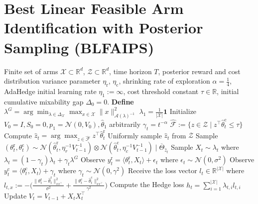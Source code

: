 \documentclass[accepted]{uai2025} %
\theoremstyle{plain}
\theoremstyle{definition}
\theoremstyle{remark}
\begin{document}
\section{Best Linear Feasible Arm Identification with Posterior Sampling (BLFAIPS)}
\begin{algorithm}
\begin{algorithmic}[1]
\Require Finite set of arms $\mathcal{X} \subset \mathbb{R}^d$, $\mathcal{Z} \subset \mathbb{R}^d$, time horizon $T$, posterior reward and cost distribution variance parameter $\eta_\mathrm{r}$, $\eta_\mathrm{c}$, shrinking rate of exploration $\alpha=\frac{1}{4}$, AdaHedge initial learning rate $\eta_1:=\infty$, cost threshold constant $\tau \in \mathbb{R}$, initial cumulative mixability gap $\Delta_0=0$.
\State \textbf{Define} $\lambda^G = \arg\min_{\lambda \in \Delta_{\mathcal{X}}} \max_{x \in \mathcal{X}} \lVert x\rVert^2_{\mathcal{A}(\lambda)^{-1}}$
\State $\lambda_1 = \frac{1}{|\mathcal{X}|} \mathbf{1}$
\State Initialize $V_0 = I, S_0 = 0, p_1 = \mathcal{N}(0,V_0), \hat{\theta}_1$ arbitrarily
    \State $\gamma_t = t^{-\alpha}$
    \State $\hat{\mathcal{F}} := \{ z\in \mathcal{Z} \mid z^\top \hat{\theta}^{\mathrm{c}}_t \le \tau \}$
        \State Compute $\hat{z}_t = \arg\max_{z \in \hat{\mathcal{F}}} z^\top \hat{\theta}^{\mathrm{r}}_t$
    \Else
        \State Uniformly sample $\hat{z}_t$ from $\mathcal{Z}$
    \EndIf
    \State Sample $(\theta^{\mathrm{r}}_t,  \theta^{\mathrm{c}}_t) \sim \mathcal{N}(\hat{\theta}^{\mathrm{r}}_t, \eta_r^{-1} V_{t-1}^{-1}) \otimes \mathcal{N}(\hat{\theta}^{\mathrm{c}}_t, \eta_c^{-1} V_{t-1}^{-1}) \mid \overline{\Theta}_{\hat{z}_t}$
    \State Sample $X_t \sim \lambda_t$ where $\lambda_t = (1-\gamma_t) \lambda_t + \gamma_t \lambda^G$
    \State Observe $y^{\mathrm{r}}_t = \langle \theta^{\mathrm{r}}_t, X_t \rangle + \epsilon_t$ where $\epsilon_t \sim \mathcal{N}(0,\sigma^2)$
    \State Observe $y^{\mathrm{c}}_t = \langle \theta^{\mathrm{c}}_t, X_t \rangle + \gamma_t$ where $\gamma_t \sim \mathcal{N}(0,\gamma^2)$
    \State Receive the loss vector $l_t \in \mathbb{R}^{|\mathcal{X}|}$ where 
     $l_{t,x} := -\Big( \frac{\lVert \theta_t^{\mathrm{r}} - \hat{\theta}_t^{\mathrm{r}} \rVert^2_{x x^\top}}{\sigma^2} + \frac{\lVert \theta_t^{\mathrm{c}} - \hat{\theta}_t^{\mathrm{c}} \rVert^2_{x x^\top}}{\gamma^2} \Big)$
    \State Compute the Hedge loss $h_t = \sum_{i=1}^{|\mathcal{X}|} \lambda_{t,i} l_{t,i}$
    \State Update $V_t = V_{t-1} + X_t X_t^\top$

\end{algorithmic}
\end{algorithm}
\end{document}
